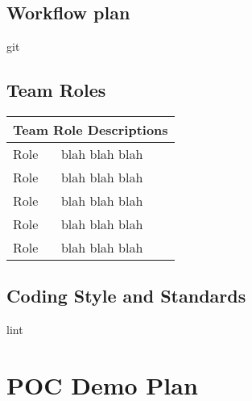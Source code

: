 \documentclass{article}
\begin{document}
\subsection{Workflow plan}
git

\subsection{Team Roles}
\begin{tabular}{ |p{5cm}|p{8cm}| }
	\hline
	\multicolumn{2}{|c|}{Team Role Descriptions} \\
	\hline
	Role & blah blah blah \\
	\hline
	Role & blah blah blah \\
	\hline
	Role & blah blah blah \\
	\hline
	Role & blah blah blah \\
	\hline
	Role & blah blah blah \\
	\hline
\end{tabular}

\subsection{Coding Style and Standards}
lint

\section {POC Demo Plan}
\end{document}

